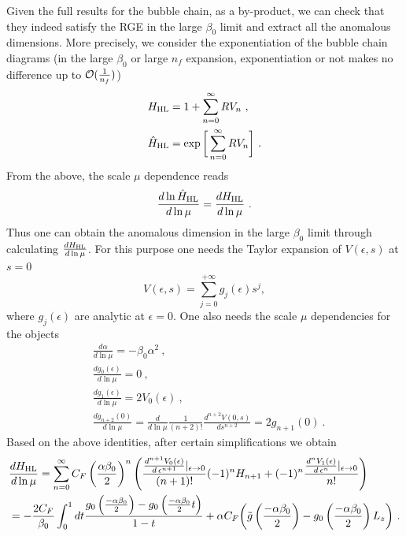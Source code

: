 \documentclass[a4paper,11pt]{article}
\begin{document}
Given the full results for the bubble chain, as a by-product, we can check that they indeed satisfy the RGE in the large $\beta_0$ limit and extract all the anomalous dimensions. More precisely, we consider the exponentiation of the bubble chain diagrams (in the large $\beta_0$ or large $n_f$ expansion, exponentiation or not makes no difference up to ${\cal O}(\frac{1}{n_f})$)
\begin{align}
& H_{ \rm HL} = 1+\sum_{n=0}^{\infty} RV_n  \ ,  \\ 
& \hat H_{ \rm HL} = \exp \bigg[\sum_{n=0}^{\infty} RV_n \bigg] \ .
\end{align}
From the above, the scale $\mu$ dependence reads
\begin{equation}
    \frac{d \ln \hat H_{ \rm HL}}{d \ln \mu} = \frac{d H_{\rm HL}}{d \ln \mu} \ .
\end{equation}
Thus one can obtain the anomalous dimension in the large $\beta_0$ limit through calculating $\frac{d H_{\rm HL}}{d \ln \mu}$. For this purpose one needs the Taylor expansion of $V(\epsilon,s)$ at $s=0$
\begin{equation}\label{eq:Gexpand}
    V(\epsilon,s)=\sum_{j=0}^{+\infty} g_{j}(\epsilon) s^j,
\end{equation}
where $g_{j}(\epsilon)$ are analytic at $\epsilon=0$. One also needs the scale $\mu$ dependencies for the objects
\begin{align}
    &\frac{d \alpha}{d \ln \mu} = -\beta_0 \alpha^2  \ , \nonumber\\
    &\frac{d g_{0}(\epsilon)}{d \ln \mu} = 0  \ , \nonumber\\
    &\frac{d g_{1}(\epsilon)}{d \ln \mu} = 2 V_{0}(\epsilon) \ , \nonumber\\
    &\frac{d g_{n+2}(0)}{d \ln \mu} = \frac{d}{d \ln \mu} \frac{1}{(n+2)!}\frac{d^{n+2} V(0,s)}{d s^{n+2}} = 2 g_{n+1}(0) \ .
\end{align}
Based on the above identities, after certain simplifications we obtain
\begin{align}
&\frac{d H_{\rm HL}}{d \ln \mu} = \sum_{n=0}^{\infty}C_F \left( \frac{\alpha \beta_0}{2} \right)^{n} \left( \frac{ \frac{d^{n+1} V_0(\epsilon)}{d \, \epsilon^{n+1}} |_{\epsilon \rightarrow 0}}{(n+1)!}(-1)^n H_{n+1} +(-1)^n\frac{ \frac{d^{n} V_1(\epsilon)}{d \, \epsilon^{n}} |_{\epsilon \rightarrow 0}}{n!} \right) \nonumber\\
&=-\frac{2C_F}{\beta_0} \int_0^1 dt \frac{g_0\left(\frac{-\alpha \beta_0}{2} \right)-g_0\left(\frac{-\alpha \beta_0}{2} t \right)}{1-t} 
+ \alpha C_F\bigg(\tilde{g}\left( \frac{-\alpha \beta_0}{2} \right) -g_0\left( \frac{-\alpha \beta_0}{2} \right)L_z\bigg) \ .
\end{align}
\end{document}
